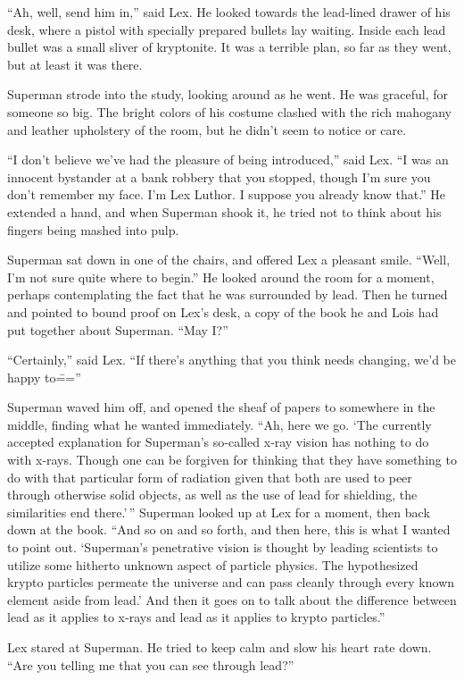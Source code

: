 \documentclass[ebook,12pt]{memoir}
\begin{document}
``Ah, well, send him in,'' said Lex. He looked towards the lead‐lined
drawer of his desk, where a pistol with specially prepared bullets lay
waiting. Inside each lead bullet was a small sliver of kryptonite. It
was a terrible plan, so far as they went, but at least it was there.

Superman strode into the study, looking around as he went. He was
graceful, for someone so big. The bright colors of his costume clashed
with the rich mahogany and leather upholstery of the room, but he didn't
seem to notice or care.

``I don't believe we've had the pleasure of being introduced,'' said
Lex. ``I was an innocent bystander at a bank robbery that you stopped,
though I'm sure you don't remember my face. I'm Lex Luthor. I suppose
you already know that.'' He extended a hand, and when Superman shook it,
he tried not to think about his fingers being mashed into pulp.

Superman sat down in one of the chairs, and offered Lex a pleasant
smile. ``Well, I'm not sure quite where to begin.'' He looked around the
room for a moment, perhaps contemplating the fact that he was surrounded
by lead. Then he turned and pointed to bound proof on Lex's desk, a copy
of the book he and Lois had put together about Superman. ``May I?''

``Certainly,'' said Lex. ``If there's anything that you think needs
changing, we'd be happy to\===''

Superman waved him off, and opened the sheaf of papers to somewhere in
the middle, finding what he wanted immediately. ``Ah, here we go. `The
currently accepted explanation for Superman's so‐called x‐ray vision has
nothing to do with x‐rays. Though one can be forgiven for thinking that
they have something to do with that particular form of radiation given
that both are used to peer through otherwise solid objects, as well as
the use of lead for shielding, the similarities end there.'\,'' Superman
looked up at Lex for a moment, then back down at the book. ``And so on
and so forth, and then here, this is what I wanted to point out.
`Superman's penetrative vision is thought by leading scientists to
utilize some hitherto unknown aspect of particle physics. The
hypothesized krypto particles permeate the universe and can pass cleanly
through every known element aside from lead.' And then it goes on to
talk about the difference between lead as it applies to x‐rays and lead
as it applies to krypto particles.''

Lex stared at Superman. He tried to keep calm and slow his heart rate
down. ``Are you telling me that you can see through lead?''
\end{document}
